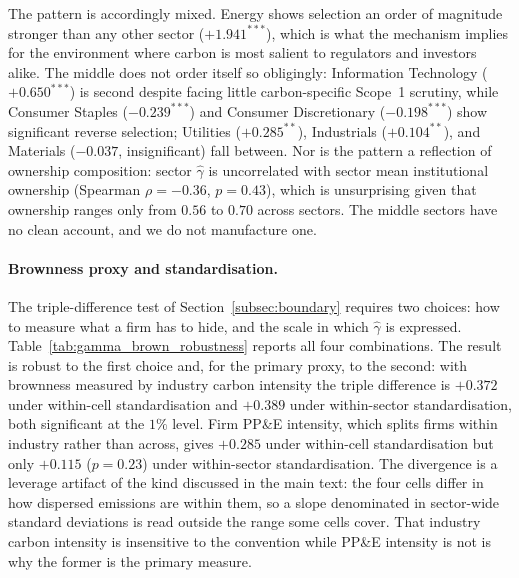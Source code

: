 \documentclass[a4paper,12pt]{article}
\begin{document}
The pattern is accordingly mixed. Energy shows selection an order of magnitude stronger than any other sector ($+1.941^{***}$), which is what the mechanism implies for the environment where carbon is most salient to regulators and investors alike. The middle does not order itself so obligingly: Information Technology ($+0.650^{***}$) is second despite facing little carbon-specific Scope~1 scrutiny, while Consumer Staples ($-0.239^{***}$) and Consumer Discretionary ($-0.198^{***}$) show significant reverse selection; Utilities ($+0.285^{**}$), Industrials ($+0.104^{**}$), and Materials ($-0.037$, insignificant) fall between. Nor is the pattern a reflection of ownership composition: sector $\hat\gamma$ is uncorrelated with sector mean institutional ownership (Spearman $\rho = -0.36$, $p = 0.43$), which is unsurprising given that ownership ranges only from $0.56$ to $0.70$ across sectors. The middle sectors have no clean account, and we do not manufacture one.

\paragraph{Brownness proxy and standardisation.} The triple-difference test of Section~\ref{subsec:boundary} requires two choices: how to measure what a firm has to hide, and the scale in which $\hat\gamma$ is expressed. Table~\ref{tab:gamma_brown_robustness} reports all four combinations. The result is robust to the first choice and, for the primary proxy, to the second: with brownness measured by industry carbon intensity the triple difference is $+0.372$ under within-cell standardisation and $+0.389$ under within-sector standardisation, both significant at the $1\%$ level. Firm PP\&E intensity, which splits firms within industry rather than across, gives $+0.285$ under within-cell standardisation but only $+0.115$ ($p=0.23$) under within-sector standardisation. The divergence is a leverage artifact of the kind discussed in the main text: the four cells differ in how dispersed emissions are within them, so a slope denominated in sector-wide standard deviations is read outside the range some cells cover. That industry carbon intensity is insensitive to the convention while PP\&E intensity is not is why the former is the primary measure.
\end{document}
